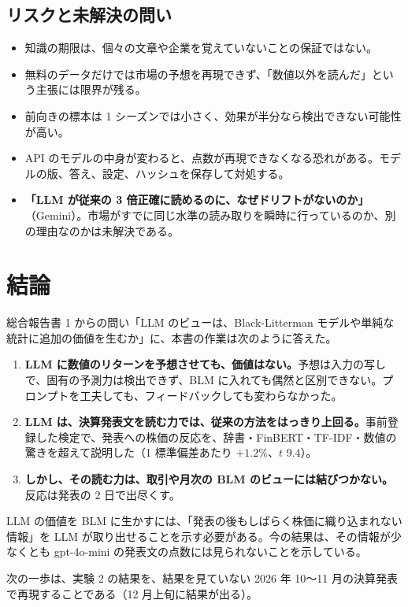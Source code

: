 \documentclass[xelatex,ja=standard,jafont=haranoaji,a4paper,10pt]{bxjsreport}
\begin{document}
\section{リスクと未解決の問い}

\begin{itemize}
\item 知識の期限は、個々の文章や企業を覚えていないことの保証ではない。
\item 無料のデータだけでは市場の予想を再現できず、「数値以外を読んだ」という主張には限界が残る。
\item 前向きの標本は 1 シーズンでは小さく、効果が半分なら検出できない可能性が高い。
\item API のモデルの中身が変わると、点数が再現できなくなる恐れがある。モデルの版、答え、設定、ハッシュを保存して対処する。
\item \textbf{「LLM が従来の 3 倍正確に読めるのに、なぜドリフトがないのか」}（Gemini）。市場がすでに同じ水準の読み取りを瞬時に行っているのか、別の理由なのかは未解決である。
\end{itemize}


\chapter{結論}\label{ch:conclusion}

総合報告書 1 からの問い「LLM のビューは、Black-Litterman モデルや単純な統計に追加の価値を生むか」に、本書の作業は次のように答えた。

\begin{enumerate}
\item \textbf{LLM に数値のリターンを予想させても、価値はない。}予想は入力の写しで、固有の予測力は検出できず、BLM に入れても偶然と区別できない。プロンプトを工夫しても、フィードバックしても変わらなかった。
\item \textbf{LLM は、決算発表文を読む力では、従来の方法をはっきり上回る。}事前登録した検定で、発表への株価の反応を、辞書・FinBERT・TF-IDF・数値の驚きを超えて説明した（1 標準偏差あたり $+1.2\%$、$t$ 9.4）。
\item \textbf{しかし、その読む力は、取引や月次の BLM のビューには結びつかない。}反応は発表の 2 日で出尽くす。
\end{enumerate}

LLM の価値を BLM に生かすには、「発表の後もしばらく株価に織り込まれない情報」を LLM が取り出せることを示す必要がある。今の結果は、その情報が少なくとも gpt-4o-mini の発表文の点数には見られないことを示している。

次の一歩は、実験 2 の結果を、結果を見ていない 2026 年 10〜11 月の決算発表で再現することである（12 月上旬に結果が出る）。
\end{document}
